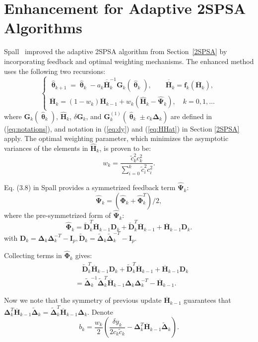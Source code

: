 \documentclass[conference,10.3cpt]{IEEEtran}
\newcommand{\bD}{\bm{D}}
\newcommand{\bG}{\bm{G}}
\newcommand{\bI}{\bm{I}}
\newcommand{\bDelta}{\bm{\Delta}}
\newcommand{\oH}{\bm{\overline{H}}}
\newcommand{\ooH}{\bm{\overline{\overline{H}}}}
\newcommand{\hH}{\bm{\hat{H}}}
\newcommand{\hPsi}{\bm{\hat{\Psi}}}
\newcommand{\htheta}{\bm{\hat{\uptheta}}}
\newcommand{\hPhi}{\bm{\hat{\Phi}}}
\newcommand{\tDelta}{\bm{\tilde{\Delta}}}
\newcommand{\tD}{\bm{\tilde{D}}}
\begin{document}
\section{Enhancement for Adaptive 2SPSA Algorithms}  \label{Enhanced 2SPSA}
Spall~\cite{Spall2009} improved the adaptive 2SPSA
algorithm from Section~\ref{2SPSA} by incorporating feedback and
optimal weighting mechanisms. The enhanced method
uses the following two recursions:
\begin{equation} \label{eq:Enhancement}
  \begin{cases} \htheta_{k+1}=\htheta_k-a_k\ooH_k^{-1} \bG_k(\htheta_k),
    \qquad \bm{\ooH}_k=\bm{f}_k(\oH_k),\\
    \oH_k=(1-w_k)\oH_{k-1}+w_k(\hH_k-\hPsi_k),
    \quad k=0,1,\dots
  \end{cases}
\end{equation}
where $\bG_k(\htheta_k)$, $\hH_k$,
$\delta\bG_k$, and $\bG_k^{(1)}(\htheta_k\pm c_k\bDelta_k)$ are
defined in (\ref{eq:notations}), and notation in (\ref{eq:dy}) and
(\ref{eq:HHat}) in Section \ref{2SPSA} apply. The optimal weighting
parameter, which minimizes the asymptotic variances of the elements in
$\hH_k$, is proven to be:
\begin{equation} \label{eq:weighting}
  w_k=\frac{\tilde{c}_k^2c_k^2}{\sum_{i=0}^{k}\tilde{c}_i^2c_i^2}.
\end{equation}

Eq. (3.8) in Spall \cite{Spall2009} provides a symmetrized feedback term $ \hPsi_k $:
\begin{equation} \label{eq:PsiHat}
\hPsi_k =(\hPhi_k+\hPhi_k^T)/2,
\end{equation}
where the pre-symmetrized form of $ \hPsi_k $:
\begin{equation}
\hPhi_k=\tD_k^T\oH_{k-1}\bD_k+\tD_k^T\oH_{k-1}+\oH_{k-1}\bD_k.
\end{equation}
with $ \bD_k=\bDelta_k\bDelta_k^{-T}-\bI_p, \tD_k=\tDelta_k\tDelta_k^{-T}-\bI_p $.

Collecting terms in $\hPhi_k$ gives:
\begin{align*}
&\quad\tD_k^T\oH_{k-1}\bD_k+\tD_k^T\oH_{k-1}+\oH_{k-1}\bD_k\\
&=\tDelta_k^{-1}\tDelta_k^{T}\oH_{k-1}\bDelta_k\bDelta_k^{-T}-\oH_{k-1}.
\end{align*}

Now we note that the symmetry of previous update $ \oH_{k-1}$ guarantees that
$\bDelta_k^{T}\oH_{k-1}\tDelta_k=\tDelta_k^{T}\oH_{k-1}\bDelta_k$. Denote
\begin{equation}
  b_k=\frac{w_k}{2}(\frac{\delta y_k}{2c_k\tilde{c}_k}-\bDelta_k^{T}\oH_{k-1}\tDelta_k).
\end{equation}
\end{document}
